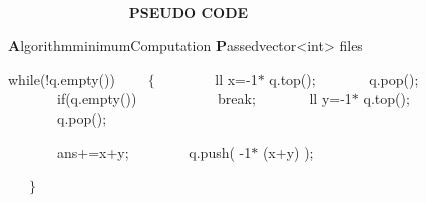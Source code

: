 \documentclass[10pt]{report}
\begin{document}
\begin{multicols}{2}


\vspace{\baselineskip}
\vspace{\baselineskip}
\textbf{\ \ \ \ \ \ \ \ \  }

\vspace{\baselineskip}
\textbf{\ \ \ \ \ \ \ \ \ \ \ \ \  \  \  PSEUDO CODE}

\vspace{\baselineskip}

\vspace{\baselineskip}
{\fontsize{12pt}{14.4pt}\selectfont \textbf{ A}lgorithm}{\fontsize{12pt}{14.4pt}\selectfont  minimumComputation}
{\fontsize{12pt}{14.4pt}\selectfont  \textbf{P}assed}{\fontsize{12pt}{14.4pt}\selectfont  vector<int> files}

\vspace{\baselineskip}

\vspace{\baselineskip}

\vspace{\baselineskip}
while(!q.empty())
\ \ \ \ $ \{ $ \   
\ \ \ \ \ \ \  ll x=-1$\ast$ q.top();
\ \ \ \ \ \ \  q.pop();
\ \ \ \ \ \ \  if(q.empty())
\ \ \ \ \ \ \ \ \ \ \  break;
\ \ \ \ \ \ \  ll y=-1$\ast$ q.top();
\ \ \ \ \ \ \  q.pop();
 
\ \ \ \ \ \ \  ans+=x+y;
\ \ \ \ \ \ \ \ q.push(  -1$\ast$ (x+y) );

\vspace{\baselineskip}
\ \ \  $ \} $ 

\vspace{\baselineskip}

\vspace{\baselineskip}

\vspace{\baselineskip}

\vspace{\baselineskip}

\vspace{\baselineskip}

\vspace{\baselineskip}

\vspace{\baselineskip}

\vspace{\baselineskip}

\vspace{\baselineskip}

\vspace{\baselineskip}


\end{multicols}
\end{document}
